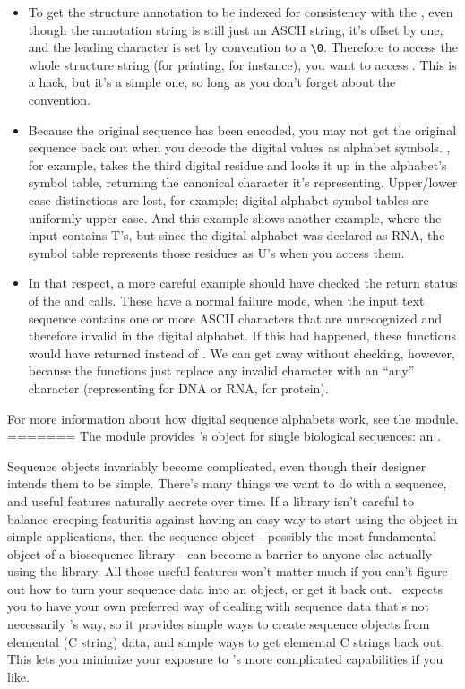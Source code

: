 \begin{itemize}
\item To get the structure annotation to be indexed  for
  consistency with the , even though the annotation string
  is still just an ASCII string, it's offset by one, and the leading
  character is set by convention to a \verb+\0+. Therefore to access
  the whole structure string (for printing, for instance), you want to
  access . This is a hack, but it's a simple one, so
  long as you don't forget about the convention.

\item Because the original sequence has been encoded, you may not get
  the original sequence back out when you decode the digital values as
  alphabet symbols. , for example, takes
  the third digital residue and looks it up in the alphabet's symbol
  table, returning the canonical character it's
  representing. Upper/lower case distinctions are lost, for example;
  digital alphabet symbol tables are uniformly upper case. And this
  example shows another example, where the input 
  contains T's, but since the digital alphabet was declared as RNA,
  the symbol table represents those residues as U's when you access
  them.

\item In that respect, a more careful example should have checked the
  return status of the  and
   calls. These have a normal failure
  mode, when the input text sequence contains one or more ASCII
  characters that are unrecognized and therefore invalid in the
  digital alphabet. If this had happened, these functions would have
  returned  instead of . We can get away
  without checking, however, because the functions just replace any
  invalid character with an ``any'' character (representing 
  for DNA or RNA,  for protein).
\end{itemize}

For more information about how digital sequence alphabets work, see
the  module.
=======
The  module provides \Easel's object for single biological
sequences: an .

Sequence objects invariably become complicated, even though their
designer intends them to be simple. There's many things we want to do
with a sequence, and useful features naturally accrete over time. If a
library isn't careful to balance creeping featuritis against having an
easy way to start using the object in simple applications, then the
sequence object - possibly the most fundamental object of a
biosequence library - can become a barrier to anyone else actually
using the library. All those useful features won't matter much if you
can't figure out how to turn your sequence data into an object, or get
it back out. \Easel\ expects you to have your own preferred way of
dealing with sequence data that's not necessarily \Easel's way, so it
provides simple ways to create sequence objects from elemental (C
string) data, and simple ways to get elemental C strings back out.
This lets you minimize your exposure to \Easel's more complicated
capabilities if you like.

